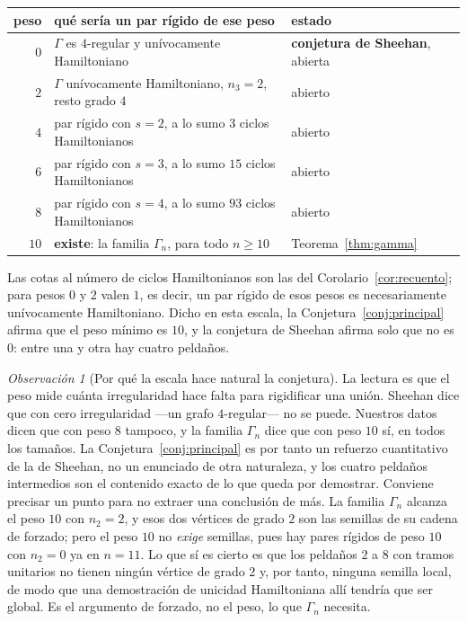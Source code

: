 \documentclass[11pt,a4paper]{article}
\theoremstyle{definition}
\theoremstyle{remark}
\newtheorem{observacion}[teorema]{Observación}
\begin{document}
\begin{center}\small
\setlength{\tabcolsep}{4pt}
\begin{tabular}{rll}
\toprule
peso & qué sería un par rígido de ese peso & estado\\
\midrule
$0$ & $\Gamma$ es $4$-regular y unívocamente Hamiltoniano & \textbf{conjetura de Sheehan}, abierta\\
$2$ & $\Gamma$ unívocamente Hamiltoniano, $n_3=2$, resto grado $4$ & abierto\\
$4$ & par rígido con $s=2$, a lo sumo $3$ ciclos Hamiltonianos & abierto\\
$6$ & par rígido con $s=3$, a lo sumo $15$ ciclos Hamiltonianos & abierto\\
$8$ & par rígido con $s=4$, a lo sumo $93$ ciclos Hamiltonianos & abierto\\
$10$ & \textbf{existe}: la familia $\Gamma_n$, para todo $n\ge10$ & Teorema~\ref{thm:gamma}\\
\bottomrule
\end{tabular}
\end{center}

Las cotas al número de ciclos Hamiltonianos son las del Corolario~\ref{cor:recuento}; para pesos $0$ y $2$ valen $1$, es decir, un par rígido de esos pesos es necesariamente unívocamente Hamiltoniano. Dicho en esta escala, la Conjetura~\ref{conj:principal} afirma que el peso mínimo es $10$, y la conjetura de Sheehan afirma solo que no es $0$: entre una y otra hay cuatro peldaños.

\begin{observacion}[Por qué la escala hace natural la conjetura]
La lectura es que el peso mide cuánta irregularidad hace falta para rigidificar una unión. Sheehan dice que con cero irregularidad —un grafo $4$-regular— no se puede. Nuestros datos dicen que con peso $8$ tampoco, y la familia $\Gamma_n$ dice que con peso $10$ sí, en todos los tamaños. La Conjetura~\ref{conj:principal} es por tanto un refuerzo cuantitativo de la de Sheehan, no un enunciado de otra naturaleza, y los cuatro peldaños intermedios son el contenido exacto de lo que queda por demostrar. Conviene precisar un punto para no extraer una conclusión de más. La familia $\Gamma_n$ alcanza el peso $10$ con $n_2=2$, y esos dos vértices de grado $2$ son las semillas de su cadena de forzado; pero el peso $10$ no \emph{exige} semillas, pues hay pares rígidos de peso $10$ con $n_2=0$ ya en $n=11$. Lo que sí es cierto es que los peldaños $2$ a $8$ con tramos unitarios no tienen ningún vértice de grado $2$ y, por tanto, ninguna semilla local, de modo que una demostración de unicidad Hamiltoniana allí tendría que ser global. Es el argumento de forzado, no el peso, lo que $\Gamma_n$ necesita.
\end{observacion}
\end{document}
